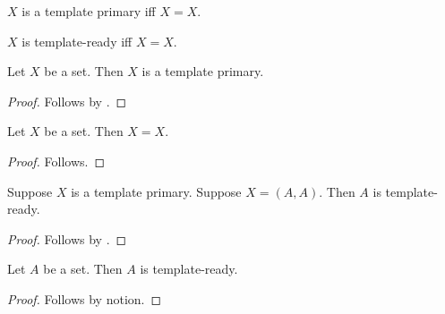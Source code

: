 \begin{definition}\label{whole_template_primary}
    $X$ is a template primary iff $X=X$.
\end{definition}

\begin{definition}\label{whole_template_target}
    $X$ is template-ready iff $X=X$.
\end{definition}

\begin{classification}\label{whole_template_all_primary}
    Let $X$ be a set.
    Then $X$ is a template primary.
\end{classification}
\begin{proof}
    Follows by .
\end{proof}

\begin{classification}\label{whole_template_reflexive}
    Let $X$ be a set.
    Then $X=X$.
\end{classification}
\begin{proof}
    Follows.
\end{proof}

\begin{classification}\label{whole_template_consumer_rule}
    Suppose $X$ is a template primary.
    Suppose $X=(A,A)$.
    Then $A$ is template-ready.
\end{classification}
\begin{proof}
    Follows by .
\end{proof}

\begin{proposition}\label{whole_template_source_consumer}
    Let $A$ be a set.
    Then $A$ is template-ready.
\end{proposition}
\begin{proof}
    Follows by notion.
\end{proof}
